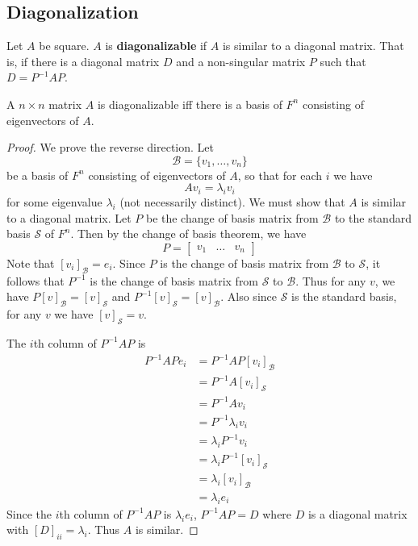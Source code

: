 \documentclass{article}
\begin{document}
\subsection{Diagonalization}
\begin{definition}
  Let $A$ be square. $A$ is \textbf{diagonalizable} if $A$ is similar to a diagonal matrix. That is, if there is a diagonal matrix $D$ and a non-singular matrix $P$ such that $D = P^{-1}AP$.
\end{definition}
\begin{theorem}
  A $n \times n$ matrix $A$ is diagonalizable iff there is a basis of $F^n$ consisting of eigenvectors of $A$.
\end{theorem}
\begin{proof}
  We prove the reverse direction. Let \[
    \mathcal{B} = \{v_1, \ldots, v_n\}
  \] be a basis of $F^n$ consisting of eigenvectors of $A$, so that for each $i$ we have \[
    Av_i = \lambda_iv_i
  \] for some eigenvalue $\lambda_i$ (not necessarily distinct). We must show that $A$ is similar to a diagonal matrix. Let $P$ be the change of basis matrix from $\mathcal{B}$ to the standard basis $\mathcal{S}$ of $F^n$. Then by the change of basis theorem, we have \[
    P =
    \begin{bmatrix}
      v_1 & \dots & v_n
    \end{bmatrix}
  \]
  Note that $[v_i]_{\mathcal{B}} = e_i$. Since $P$ is the change of basis matrix from $\mathcal{B}$ to $\mathcal{S}$, it follows that $P^{-1}$ is the change of basis matrix from $\mathcal{S}$ to $\mathcal{B}$. Thus for any $v$, we have $P[v]_\mathcal{B} = [v]_\mathcal{S}$ and $P^{-1}[v]_\mathcal{S} = [v]_\mathcal{B}$. Also since $\mathcal{S}$ is the standard basis, for any $v$ we have $[v]_\mathcal{S} = v$.

  The $i$th column of $P^{-1}AP$ is
  \begin{align*}
    P^{-1}APe_i & = P^{-1}AP[v_i]_\mathcal{B}         \\
                & = P^{-1}A[v_i]_\mathcal{S}          \\
                & = P^{-1}Av_i                        \\
                & = P^{-1}\lambda_i v_i               \\
                & = \lambda_i P^{-1}v_i               \\
                & = \lambda_i P^{-1}[v_i]_\mathcal{S} \\
                & = \lambda_i[v_i]_\mathcal{B}        \\
                & = \lambda_i e_i
  \end{align*}
  Since the $i$th column of $P^{-1}AP$ is $\lambda_ie_i$, $P^{-1}AP = D$ where $D$ is a diagonal matrix with $[D]_{ii} = \lambda_i$. Thus $A$ is similar.


\end{proof}
\end{document}
